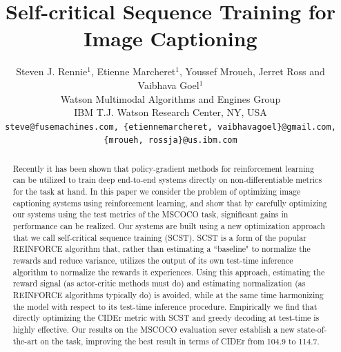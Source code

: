 \documentclass[10pt,twocolumn,letterpaper]{article}
\begin{document}
\title{Self-critical Sequence Training for Image Captioning}

\author{Steven J. Rennie$^{1}$, Etienne Marcheret$^{1}$, Youssef Mroueh, Jerret Ross and Vaibhava Goel$^{1}$\\
Watson Multimodal Algorithms and Engines Group \\
IBM T.J. Watson Research Center, NY, USA \\
{\hspace{-0.20in}\tt\small{steve@fusemachines.com, \{etiennemarcheret, vaibhavagoel\}@gmail.com}, \{mroueh, rossja\}@us.ibm.com}
}

\maketitle

{\let\thefootnote\relax{}} 
\begin{abstract}
Recently it has been shown that policy-gradient methods for reinforcement learning can be utilized to
train deep end-to-end systems directly on non-differentiable metrics for the task at hand. In this paper we consider the problem of optimizing image captioning systems using reinforcement learning, and show that by carefully optimizing our systems using the test metrics of the MSCOCO task, significant gains in performance can be realized. Our systems are built using a new optimization approach that we call self-critical sequence training (SCST). SCST is a form of the popular REINFORCE algorithm that, rather than estimating a ``baseline" to normalize the rewards and reduce variance, utilizes the output of its own test-time inference algorithm to normalize the rewards it experiences. Using this approach, estimating the reward signal (as actor-critic methods must do) and estimating normalization (as REINFORCE algorithms typically do) is avoided, while at the same time harmonizing the model with respect to its test-time inference procedure. Empirically we find that directly optimizing the CIDEr metric with SCST and greedy decoding at test-time is highly effective.  Our results on the MSCOCO evaluation sever establish a new state-of-the-art on the task, improving the best result in terms of CIDEr from 104.9 to 114.7.
\end{abstract}
\end{document}
